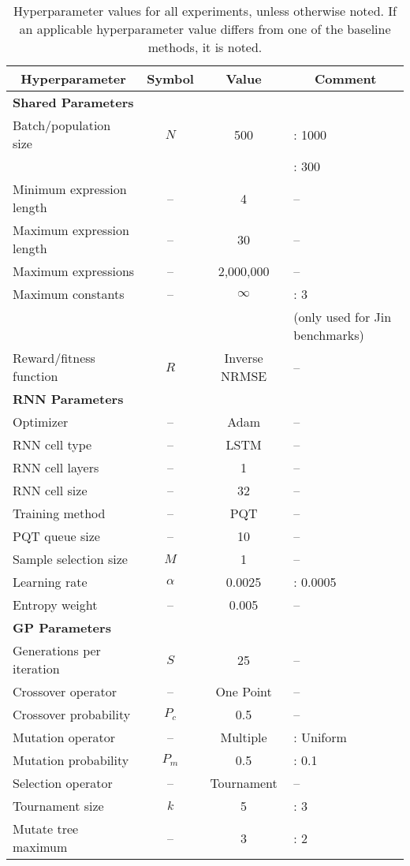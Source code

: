 \documentclass{article}
\begin{document}
\begin{table}[htbp]
  \centering
  \caption{Hyperparameter values for all experiments, unless otherwise noted. If an applicable hyperparameter value differs from one of the baseline methods, it is noted.}
    \begin{tabular}{lccl}
    \multicolumn{1}{c}{\textbf{Hyperparameter}} & \textbf{Symbol} & \textbf{Value} & \multicolumn{1}{c}{\textbf{Comment}} \\
    \midrule
    \textbf{Shared Parameters} & & & \\
    \midrule
    Batch/population size & $N$     & 500 & \citet{petersen2019deep}: 1000\\
    & & & \citet{deap2012}: 300\\
    Minimum expression length  & --    & 4 & --\\
    Maximum expression length & --    & 30 & --\\
    Maximum expressions & --    & 2,000,000 & --\\
    Maximum constants & --    & $\infty$ & \citet{petersen2019deep}: 3 \\
    & & & (only used for Jin benchmarks) \\
    Reward/fitness function & $R$ & Inverse NRMSE & --\\
    \midrule
    \textbf{RNN Parameters} &       &  & \\
    \midrule
    Optimizer & --    & Adam & --\\
    RNN cell type & -- & LSTM & --\\
    RNN cell layers & -- & 1 & --\\
    RNN cell size & -- & 32 & --\\
    Training method & --    & PQT & --\\
    PQT queue size & --    & 10 & --\\
    Sample selection size & $M$     & 1 & --\\
    Learning rate & $\alpha$ & 0.0025 & \citet{petersen2019deep}: 0.0005\\
    Entropy weight & -- & 0.005 & --\\
    \midrule
    \textbf{GP Parameters} & & &\\
    \midrule
    Generations per iteration & $S$     & 25 & -- \\
    Crossover operator & -- & One Point & -- \\
    Crossover probability & $P_c$   & 0.5 & -- \\
    Mutation operator & -- & Multiple & \citet{deap2012}: Uniform\\
    Mutation probability & $P_m$   & 0.5 & \citet{deap2012}: 0.1\\
    Selection operator & -- & Tournament & -- \\
    Tournament size & $k$     & 5 & \citet{deap2012}: 3 \\
    Mutate tree maximum & -- & 3 & \citet{deap2012}: 2 \\
    \end{tabular}
  \label{tab:hyperparameters}
\end{table}
\end{document}
